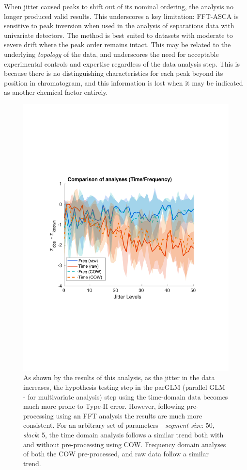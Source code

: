 \documentclass[preprint,12pt]{elsarticle}
\begin{document}
When jitter caused peaks to shift out of its nominal ordering, the analysis no longer produced valid results. This underscores a key limitation: FFT-ASCA is sensitive to peak inversion when used in the analysis of separations data with univariate detectors. The method is best suited to datasets with moderate to severe drift where the peak order remains intact. This may be related to the underlying \textit{topology} of the data, and underscores the need for acceptable experimental controls and expertise regardless of the data analysis step. This is because there is no distinguishing characteristics for each peak beyond its position in chromatogram, and this information is lost when it may be indicated as another chemical factor entirely.

\begin{figure}[ht!]
    \centering
    \includegraphics[width=0.9\linewidth]{comparison.pdf}
    \caption{As shown by the results of this analysis, as the jitter in the data increases, the hypothesis testing step in the parGLM (parallel GLM - for multivariate analysis) step using the time-domain data becomes much more prone to Type-II error. However, following pre-processing using an FFT analysis the results are much more consistent. For an arbitrary set of parameters -\textit{ segment size}: 50, \textit{slack}: 5, the time domain analysis follows a similar trend both with and without pre-processing using COW. Frequency domain analyses of both the COW pre-processed, and raw data follow a similar trend.}
    \label{fig:compare}
\end{figure}
\end{document}
